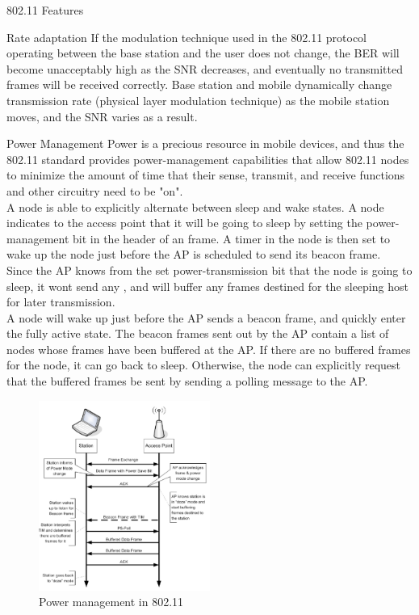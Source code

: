 \begin{section}{802.11 Features}
\begin{subsection}{Rate adaptation}
    If the modulation technique used in the 802.11 protocol operating between the base
    station and the user does not change, the BER will become unacceptably high as the
    SNR decreases, and eventually no transmitted frames will be received correctly.
    Base station and mobile dynamically change transmission rate (physical layer modulation technique) 
    as the mobile station moves, and the SNR varies as a result.
  \end{subsection}
  \begin{subsection}{Power Management}
    \label{sub:power management}
    Power is a precious resource in mobile devices, and thus the 802.11 standard provides 
    power-management capabilities that allow 802.11 nodes to minimize the amount of time that 
    their sense, transmit, and receive functions and other circuitry need to be "on".\\
    A node is able to explicitly alternate between sleep and wake states. A node indicates to the 
    access point that it will be going to sleep by setting the power-management bit in the header 
    of an frame. A timer in the node is then set to wake up the node just before the AP is 
    scheduled to send its beacon frame.\\
    Since the AP knows from the set power-transmission bit that the node is going to sleep, it wont send any
    , and will buffer any frames destined for the sleeping host for later transmission.\\
    A node will wake up just before the AP sends a beacon frame, and quickly enter the fully active 
    state.
    The beacon frames sent out by the AP contain a list of nodes whose frames have been buffered 
    at the AP. If there are no buffered frames for the node, it can go back to sleep. Otherwise, 
    the node can explicitly request that the buffered frames be sent by sending a polling message 
    to the AP.

    \begin{figure}[h]
      \centering
      \includegraphics[width=0.5\textwidth]{img/wireless/80211 power saving.png}
      \caption{Power management in 802.11}
    \end{figure}

  \end{subsection}

\end{section}
